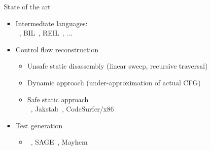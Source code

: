 \begin{frame}{State of the art}
\begin{center}
\end{center}
\begin{itemize}
\item Intermediate languages:\\ {\color{red}{DBA}}~, BIL~, REIL~, ...
\medskip
\item Control flow reconstruction
\begin{itemize}
\item Unsafe static disassembly (linear sweep, recursive traversal)
\item Dynamic approach (under-approximation of actual CFG)
\item Safe static approach \\
{\color{red}{CFGBuilder}}~, Jakstab~, CodeSurfer/x86~
\end{itemize}
\medskip
\item Test generation
\begin{itemize}
\item {\color{red}{OSMOSE}}~, SAGE~, Mayhem~
\end{itemize}
\end{itemize}
\end{frame}




